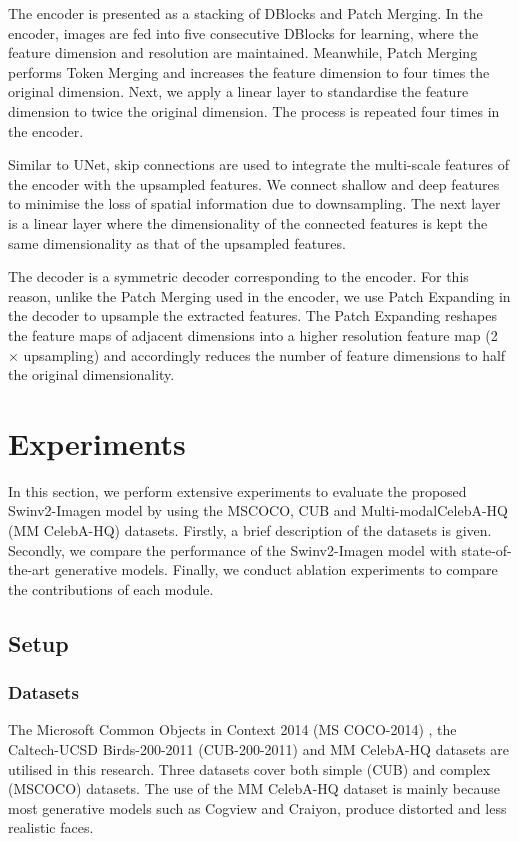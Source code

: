 \documentclass{article}
\begin{document}
The encoder is presented as a stacking of DBlocks and Patch Merging. In the encoder, images are fed into five consecutive DBlocks for learning, where the feature dimension and resolution are maintained. Meanwhile, Patch Merging performs Token Merging and increases the feature dimension to four times the original dimension. Next, we apply a linear layer to standardise the feature dimension to twice the original dimension. The process is repeated four times in the encoder.

Similar to UNet, skip connections are used to integrate the multi-scale features of the encoder with the upsampled features. We connect shallow and deep features to minimise the loss of spatial information due to downsampling. The next layer is a linear layer where the dimensionality of the connected features is kept the same dimensionality as that of the upsampled features.

The decoder is a symmetric decoder corresponding to the encoder. For this reason, unlike the Patch Merging used in the encoder, we use Patch Expanding in the decoder to upsample the extracted features. The Patch Expanding reshapes the feature maps of adjacent dimensions into a higher resolution feature map (2 × upsampling) and accordingly reduces the number of feature dimensions to half the original dimensionality.

\section{Experiments}
In this section, we perform extensive experiments to evaluate the proposed Swinv2-Imagen model by using the MSCOCO, CUB and Multi-modalCelebA-HQ (MM CelebA-HQ) datasets. Firstly, a brief description of the datasets is given. Secondly, we compare the performance of the Swinv2-Imagen model with state-of-the-art generative models. Finally, we conduct ablation experiments to compare the contributions of each module.

\subsection{Setup}
\subsubsection{Datasets}
The Microsoft Common Objects in Context 2014 (MS COCO-2014) \cite{Cho2014LearningPR}, the Caltech-UCSD Birds-200-2011 (CUB-200-2011) \cite{Ho2022ClassifierFreeDG}  and MM CelebA-HQ \cite{Xia2021TediGANTD} datasets are utilised in this research. Three datasets cover both simple (CUB) and complex (MSCOCO) datasets. The use of the MM CelebA-HQ dataset is mainly because most generative models such as Cogview and Craiyon, produce distorted and less realistic faces. 
\end{document}
